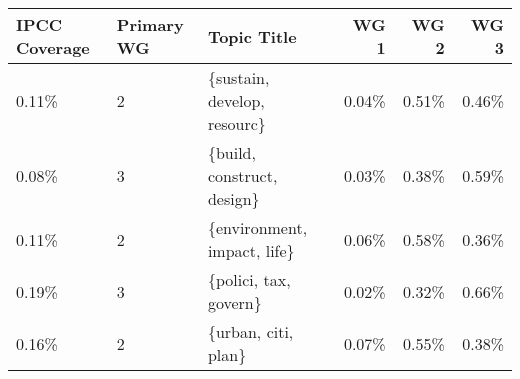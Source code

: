 \begin{tabular}{p{1.4cm} p{1cm} l r r r}
\toprule
 IPCC Coverage &  Primary WG &                  Topic Title &  WG 1 &  WG 2 &  WG 3 \\
\midrule
         0.11\% &           2 &  \{sustain, develop, resourc\} & 0.04\% & 0.51\% & 0.46\% \\
         0.08\% &           3 &   \{build, construct, design\} & 0.03\% & 0.38\% & 0.59\% \\
         0.11\% &           2 &  \{environment, impact, life\} & 0.06\% & 0.58\% & 0.36\% \\
         0.19\% &           3 &        \{polici, tax, govern\} & 0.02\% & 0.32\% & 0.66\% \\
         0.16\% &           2 &          \{urban, citi, plan\} & 0.07\% & 0.55\% & 0.38\% \\
\bottomrule
\end{tabular}
